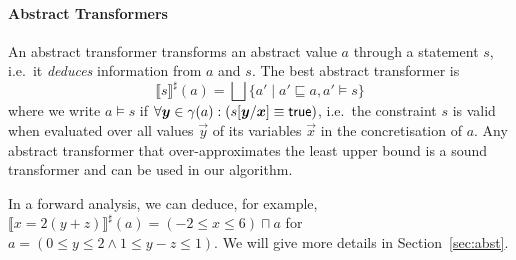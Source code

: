 \paragraph{Abstract Transformers}
%
%
An abstract transformer transforms an abstract value $a$ through a
statement $s$, i.e.\ it \emph{deduces} information from $a$ and $s$.
The best abstract transformer is
\[\llbracket s
\rrbracket^\sharp(a)=\bigsqcup \{a'\mid a'\sqsubseteq a, a'\models s\}\] where we write
$a\models s$ if $\forall {\boldsymbol y}\in\gamma(a): (s[{\boldsymbol y}/{\boldsymbol x}]
\equiv \mathsf{true})$, i.e.\ the constraint $s$ is valid when evaluated over
all values $\vec{y}$ of its variables $\vec{x}$ in the concretisation
of $a$. Any abstract transformer that over-approximates the least
upper bound is a sound transformer and can be used in our algorithm.

In a forward analysis, we can deduce, for example, $\llbracket
x=2(y+z)\rrbracket^\sharp(a)=(-2\leq x\leq 6) \sqcap a$ for $a=(0\leq y \leq 2
\wedge 1 \leq y-z \leq 1)$.
%
We will give more details in Section~\ref{sec:abst}.

